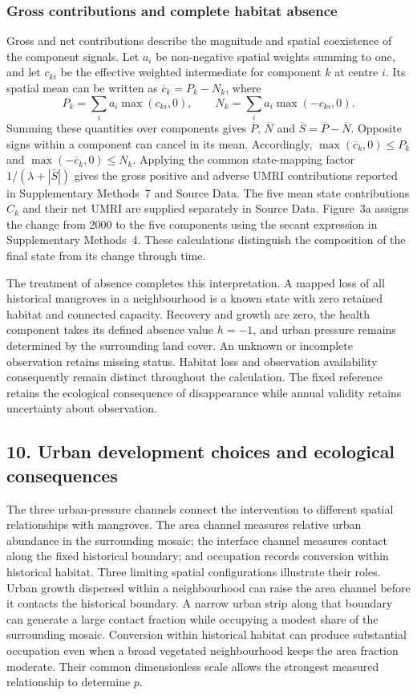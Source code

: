 \endgroup

\subsubsection{Gross contributions and complete habitat absence}

Gross and net contributions describe the magnitude and spatial coexistence of the component signals. Let $a_i$ be non-negative spatial weights summing to one, and let $c_{ki}$ be the effective weighted intermediate for component $k$ at centre $i$. Its spatial mean can be written as $\overline c_k=P_k-N_k$, where
\[
P_k=\sum_i a_i\max(c_{ki},0),\qquad
N_k=\sum_i a_i\max(-c_{ki},0).
\]
Summing these quantities over components gives $\overline P$, $\overline N$ and $\overline S=\overline P-\overline N$. Opposite signs within a component can cancel in its mean. Accordingly, $\max(\overline c_k,0)\leq P_k$ and $\max(-\overline c_k,0)\leq N_k$. Applying the common state-mapping factor $1/(\lambda+|\bar S|)$ gives the gross positive and adverse UMRI contributions reported in Supplementary Methods~7 and Source Data. The five mean state contributions $C_k$ and their net UMRI are supplied separately in Source Data. Figure~3a assigns the change from 2000 to the five components using the secant expression in Supplementary Methods~4. These calculations distinguish the composition of the final state from its change through time.

The treatment of absence completes this interpretation. A mapped loss of all historical mangroves in a neighbourhood is a known state with zero retained habitat and connected capacity. Recovery and growth are zero, the health component takes its defined absence value $h=-1$, and urban pressure remains determined by the surrounding land cover. An unknown or incomplete observation retains missing status. Habitat loss and observation availability consequently remain distinct throughout the calculation. The fixed reference retains the ecological consequence of disappearance while annual validity retains uncertainty about observation.

\subsection{10. Urban development choices and ecological consequences}
\label{note:planning}

The three urban-pressure channels connect the intervention to different spatial relationships with mangroves. The area channel measures relative urban abundance in the surrounding mosaic; the interface channel measures contact along the fixed historical boundary; and occupation records conversion within historical habitat. Three limiting spatial configurations illustrate their roles. Urban growth dispersed within a neighbourhood can raise the area channel before it contacts the historical boundary. A narrow urban strip along that boundary can generate a large contact fraction while occupying a modest share of the surrounding mosaic. Conversion within historical habitat can produce substantial occupation even when a broad vegetated neighbourhood keeps the area fraction moderate. Their common dimensionless scale allows the strongest measured relationship to determine $p$.

